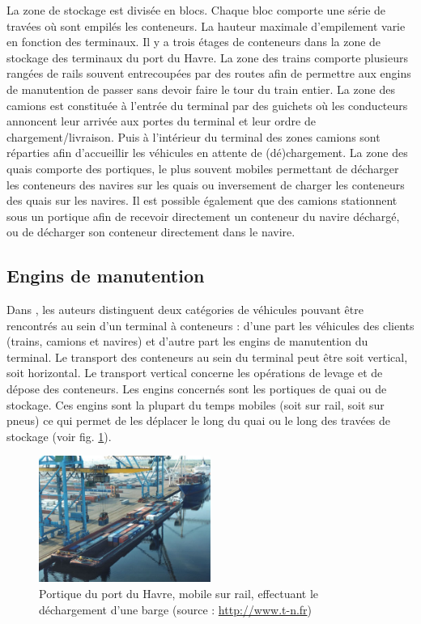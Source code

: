 La zone de stockage est divisée en blocs. Chaque bloc comporte une série de travées où sont empilés les conteneurs. La hauteur maximale d'empilement varie en fonction des terminaux. Il y a trois étages de conteneurs dans la zone de stockage des terminaux du port du Havre.
La zone des trains comporte plusieurs rangées de rails souvent entrecoupées par des routes afin de permettre aux engins de manutention de passer sans devoir faire le tour du train entier.
La zone des camions est constituée à l'entrée du terminal par des guichets où les conducteurs annoncent leur arrivée aux portes du terminal et leur ordre de chargement/livraison. Puis à l'intérieur du terminal des zones camions sont réparties afin d'accueillir les véhicules en attente de (dé)chargement.
La zone des quais comporte des portiques, le plus souvent mobiles permettant de décharger les conteneurs des navires sur les quais ou inversement de charger les conteneurs des quais sur les navires. Il est possible également que des camions stationnent sous un portique afin de recevoir directement un conteneur du navire déchargé, ou de décharger son conteneur directement dans le navire.

\subsection{Engins de manutention}

Dans \cite{Steenken2004}, les auteurs distinguent deux catégories de véhicules pouvant être rencontrés au sein d'un terminal à conteneurs : d'une part les véhicules des clients (trains, camions et navires) et d'autre part les engins de manutention du terminal.
Le transport des conteneurs au sein du terminal peut être soit vertical, soit horizontal. Le transport vertical concerne les opérations de levage et de dépose des conteneurs. Les engins concernés sont les portiques de quai ou de stockage. Ces engins sont la plupart du temps mobiles (soit sur rail, soit sur pneus) ce qui permet de les déplacer le long du quai ou le long des travées de stockage (voir fig. \ref{fig:portiqueBarge}). 

\begin{figure}[ht]
 \begin{center}
  \includegraphics[width=0.5\textwidth]{chapitres/application/portique_barge.jpg}
  \caption{Portique du port du Havre, mobile sur rail, effectuant le déchargement d'une barge (source : \url{http://www.t-n.fr})}
  \label{fig:portiqueBarge}
 \end{center}
\end{figure}

